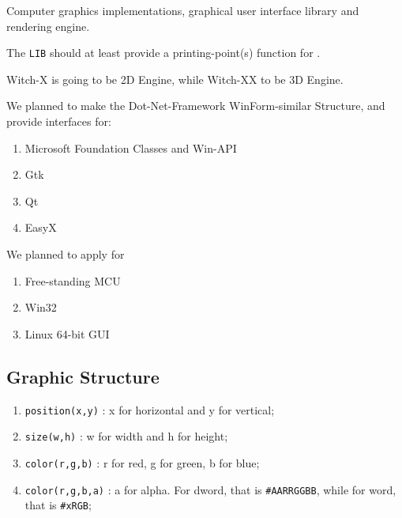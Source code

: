
Computer graphics implementations, graphical user interface library and rendering engine.

The \verb`LIB` should at least provide a printing-point(s) function for .

Witch-X is going to be 2D Engine, while Witch-XX to be 3D Engine.

We planned to make the Dot-Net-Framework WinForm-similar Structure, and provide interfaces for:

\begin{enumerate}
	\item Microsoft Foundation Classes and Win-API
	\item Gtk
	\item Qt
	\item EasyX
\end{enumerate}

We planned to apply for

\begin{enumerate}
	\item Free-standing MCU
	\item Win32
	\item Linux 64-bit GUI
\end{enumerate}

\subsection{Graphic Structure}

\begin{enumerate}
	\item \verb`position(x,y)`  : x for horizontal and y for vertical;
	\item \verb`size(w,h)`      : w for width and h for height;
	\item \verb`color(r,g,b)`   : r for red, g for green, b for blue;
	\item \verb`color(r,g,b,a)` : a for alpha. For dword, that is \verb`#AARRGGBB`, while for word, that is \verb|#xRGB|;	
\end{enumerate}

